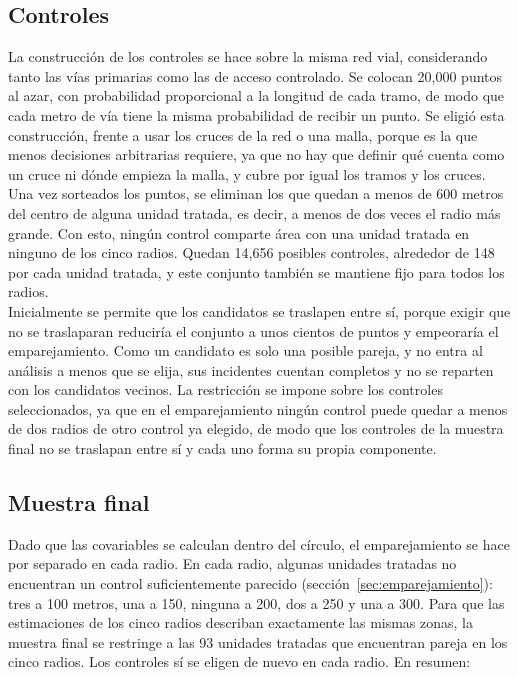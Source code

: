 \subsection{Controles}
\label{sec:controles}

\noindent La construcción de los controles se hace sobre la misma red vial, considerando tanto las vías primarias como las de acceso controlado. Se colocan 20,000 puntos al azar, con probabilidad proporcional a la longitud de cada tramo, de modo que cada metro de vía tiene la misma probabilidad de recibir un punto. Se eligió esta construcción, frente a usar los cruces de la red o una malla, porque es la que menos decisiones arbitrarias requiere, ya que no hay que definir qué cuenta como un cruce ni dónde empieza la malla, y cubre por igual los tramos y los cruces.\\

Una vez sorteados los puntos, se eliminan los que quedan a menos de 600 metros del centro de alguna unidad tratada, es decir, a menos de dos veces el radio más grande. Con esto, ningún control comparte área con una unidad tratada en ninguno de los cinco radios. Quedan 14,656 posibles controles, alrededor de 148 por cada unidad tratada, y este conjunto también se mantiene fijo para todos los radios.\\

Inicialmente se permite que los candidatos se traslapen entre sí, porque exigir que no se traslaparan reduciría el conjunto a unos cientos de puntos y empeoraría el emparejamiento. Como un candidato es solo una posible pareja, y no entra al análisis a menos que se elija, sus incidentes cuentan completos y no se reparten con los candidatos vecinos. La restricción se impone sobre los controles seleccionados, ya que en el emparejamiento ningún control puede quedar a menos de dos radios de otro control ya elegido, de modo que los controles de la muestra final no se traslapan entre sí y cada uno forma su propia componente.

\subsection{Muestra final}

\noindent Dado que las covariables se calculan dentro del círculo, el emparejamiento se hace por separado en cada radio. En cada radio, algunas unidades tratadas no encuentran un control suficientemente parecido (sección~\ref{sec:emparejamiento}): tres a 100 metros, una a 150, ninguna a 200, dos a 250 y una a 300. Para que las estimaciones de los cinco radios describan exactamente las mismas zonas, la muestra final se restringe a las 93 unidades tratadas que encuentran pareja en los cinco radios. Los controles sí se eligen de nuevo en cada radio. En resumen:

